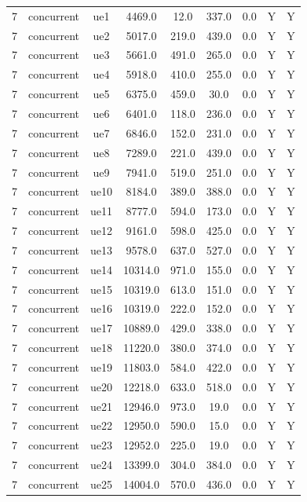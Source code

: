 \begin{table}[ht]
\begin{tabular}{|c|c|c|c|c|c|c|c|c|}
\hline
7 & concurrent & ue1 & 4469.0 & 12.0 & 337.0 & 0.0 & Y & Y \\
7 & concurrent & ue2 & 5017.0 & 219.0 & 439.0 & 0.0 & Y & Y \\
7 & concurrent & ue3 & 5661.0 & 491.0 & 265.0 & 0.0 & Y & Y \\
7 & concurrent & ue4 & 5918.0 & 410.0 & 255.0 & 0.0 & Y & Y \\
7 & concurrent & ue5 & 6375.0 & 459.0 & 30.0 & 0.0 & Y & Y \\
7 & concurrent & ue6 & 6401.0 & 118.0 & 236.0 & 0.0 & Y & Y \\
7 & concurrent & ue7 & 6846.0 & 152.0 & 231.0 & 0.0 & Y & Y \\
7 & concurrent & ue8 & 7289.0 & 221.0 & 439.0 & 0.0 & Y & Y \\
7 & concurrent & ue9 & 7941.0 & 519.0 & 251.0 & 0.0 & Y & Y \\
7 & concurrent & ue10 & 8184.0 & 389.0 & 388.0 & 0.0 & Y & Y \\
7 & concurrent & ue11 & 8777.0 & 594.0 & 173.0 & 0.0 & Y & Y \\
7 & concurrent & ue12 & 9161.0 & 598.0 & 425.0 & 0.0 & Y & Y \\
7 & concurrent & ue13 & 9578.0 & 637.0 & 527.0 & 0.0 & Y & Y \\
7 & concurrent & ue14 & 10314.0 & 971.0 & 155.0 & 0.0 & Y & Y \\
7 & concurrent & ue15 & 10319.0 & 613.0 & 151.0 & 0.0 & Y & Y \\
7 & concurrent & ue16 & 10319.0 & 222.0 & 152.0 & 0.0 & Y & Y \\
7 & concurrent & ue17 & 10889.0 & 429.0 & 338.0 & 0.0 & Y & Y \\
7 & concurrent & ue18 & 11220.0 & 380.0 & 374.0 & 0.0 & Y & Y \\
7 & concurrent & ue19 & 11803.0 & 584.0 & 422.0 & 0.0 & Y & Y \\
7 & concurrent & ue20 & 12218.0 & 633.0 & 518.0 & 0.0 & Y & Y \\
7 & concurrent & ue21 & 12946.0 & 973.0 & 19.0 & 0.0 & Y & Y \\
7 & concurrent & ue22 & 12950.0 & 590.0 & 15.0 & 0.0 & Y & Y \\
7 & concurrent & ue23 & 12952.0 & 225.0 & 19.0 & 0.0 & Y & Y \\
7 & concurrent & ue24 & 13399.0 & 304.0 & 384.0 & 0.0 & Y & Y \\
7 & concurrent & ue25 & 14004.0 & 570.0 & 436.0 & 0.0 & Y & Y \\

\end{tabular}
\end{table}
